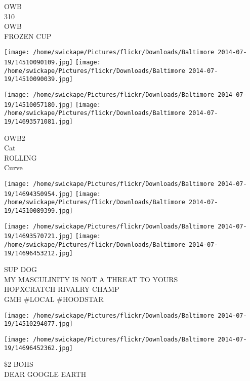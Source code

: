 \documentclass[10pt,letterpaper]{article}
\begin{document}
OWB\\
310\\
OWB\\
FROZEN CUP
\pagebreak

\texttt{[image: /home/swickape/Pictures/flickr/Downloads/Baltimore 2014-07-19/14510090109.jpg]}
\texttt{[image: /home/swickape/Pictures/flickr/Downloads/Baltimore 2014-07-19/14510090039.jpg]}

\texttt{[image: /home/swickape/Pictures/flickr/Downloads/Baltimore 2014-07-19/14510057180.jpg]}
\texttt{[image: /home/swickape/Pictures/flickr/Downloads/Baltimore 2014-07-19/14693571081.jpg]}

OWB2\\
Cat\\
ROLLING\\
Curve
\pagebreak

\texttt{[image: /home/swickape/Pictures/flickr/Downloads/Baltimore 2014-07-19/14694350954.jpg]}
\texttt{[image: /home/swickape/Pictures/flickr/Downloads/Baltimore 2014-07-19/14510089399.jpg]}

\texttt{[image: /home/swickape/Pictures/flickr/Downloads/Baltimore 2014-07-19/14693570721.jpg]}
\texttt{[image: /home/swickape/Pictures/flickr/Downloads/Baltimore 2014-07-19/14696453212.jpg]}

SUP DOG\\
MY MASCULINITY IS NOT A THREAT TO YOURS\\
HOPXCRATCH RIVALRY CHAMP\\
GMH \#LOCAL \#HOODSTAR
\pagebreak

\texttt{[image: /home/swickape/Pictures/flickr/Downloads/Baltimore 2014-07-19/14510294077.jpg]}

\vspace{0.25in}
\texttt{[image: /home/swickape/Pictures/flickr/Downloads/Baltimore 2014-07-19/14696452362.jpg]}

\$2 BOHS\\
DEAR GOOGLE EARTH
\pagebreak
\end{document}
